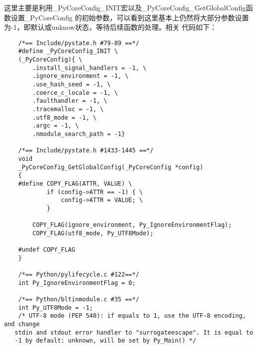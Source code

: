 \documentclass[UTF8]{book}
\begin{document}
这里主要是利用\_PyCoreConfig\_INIT宏以及\_PyCoreConfig\_GetGlobalConfig函数设置\_PyCoreConfig
的初始参数，可以看到这里基本上仍然将大部分参数设置为-1，即默认或unknow状态，等待后续函数的处理。相关
代码如下：\par
\newpage 
\begin{lstlisting}
    /*== Include/pystate.h #79-89 ==*/
    #define _PyCoreConfig_INIT \
    (_PyCoreConfig){ \
        .install_signal_handlers = -1, \
        .ignore_environment = -1, \
        .use_hash_seed = -1, \
        .coerce_c_locale = -1, \
        .faulthandler = -1, \
        .tracemalloc = -1, \
        .utf8_mode = -1, \
        .argc = -1, \
        .nmodule_search_path = -1}

    /*== Include/pystate.h #1433-1445 ==*/
    void
    _PyCoreConfig_GetGlobalConfig(_PyCoreConfig *config)
    {
    #define COPY_FLAG(ATTR, VALUE) \
            if (config->ATTR == -1) { \
                config->ATTR = VALUE; \
            }

        COPY_FLAG(ignore_environment, Py_IgnoreEnvironmentFlag);
        COPY_FLAG(utf8_mode, Py_UTF8Mode);

    #undef COPY_FLAG
    }

    /*== Python/pylifecycle.c #122==*/
    int Py_IgnoreEnvironmentFlag = 0;

    /*== Python/bltinmodule.c #35 ==*/
    int Py_UTF8Mode = -1;
    /* UTF-8 mode (PEP 540): if equals to 1, use the UTF-8 encoding, and change
   stdin and stdout error handler to "surrogateescape". It is equal to
   -1 by default: unknown, will be set by Py_Main() */

\end{lstlisting}
\end{document}
